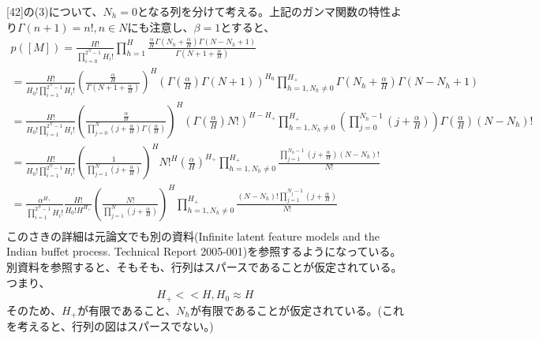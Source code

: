 ﻿\documentclass{jsarticle}
\begin{document}
[42]の(3)について、$N_h = 0$となる列を分けて考える。上記のガンマ関数の特性より$\Gamma(n+1) = n!, n \in N$にも注意し、$\beta = 1$とすると、
\begin{equation}
\begin{split}
p([M]) = \frac{H!}{\prod_{i=0}^{2^N - 1}H_i!} \prod_{h=1}^H \frac{\frac{\alpha}{H}\Gamma(N_h + \frac{\alpha}{H})\Gamma(N - N_h + 1)}{\Gamma(N + 1 + \frac{\alpha}{H})}\\
= \frac{H!}{H_0! \prod_{i=1}^{2^N - 1}H_i!} (\frac{\frac{\alpha}{H}}{\Gamma(N + 1 + \frac{\alpha}{H})})^H (\Gamma(\frac{\alpha}{H})\Gamma(N + 1))^{H_0} \prod_{h=1, N_h \neq 0}^{H_+} \Gamma(N_h + \frac{\alpha}{H})\Gamma(N - N_h + 1)\\
= \frac{H!}{H_0! \prod_{i=1}^{2^N - 1}H_i!} (\frac{\frac{\alpha}{H}}{\prod_{j = 0}^N (j + \frac{\alpha}{H})\Gamma(\frac{\alpha}{H})})^H (\Gamma(\frac{\alpha}{H})N!)^{H - H_+} \prod_{h=1, N_h \neq 0}^{H_+} (\prod_{j=0}^{N_h - 1}(j + \frac{\alpha}{H}))\Gamma(\frac{\alpha}{H})(N - N_h)!\\
= \frac{H!}{H_0! \prod_{i=1}^{2^N - 1}H_i!} (\frac{1}{\prod_{j = 1}^N (j + \frac{\alpha}{H})})^H N!^{H} (\frac{\alpha}{H})^{H_+}\prod_{h=1, N_h \neq 0}^{H_+} \frac{\prod_{j=1}^{N_h - 1}(j + \frac{\alpha}{H})(N - N_h)!}{N!}\\
= \frac{\alpha^{H_+}}{\prod_{i=1}^{2^N - 1}H_i!} \frac{H!}{H_0!H^{H_+}}(\frac{N!}{\prod_{j = 1}^N (j + \frac{\alpha}{H})})^H \prod_{h=1, N_h \neq 0}^{H_+} \frac{(N - N_h)!\prod_{j=1}^{N_j - 1}(j + \frac{\alpha}{H})}{N!}\\
\end{split}
\end{equation}
このさきの詳細は元論文でも別の資料(Infinite latent feature models and the Indian buffet process. Technical Report 2005-001)を参照するようになっている。別資料を参照すると、そもそも、行列はスパースであることが仮定されている。
つまり、
\begin{equation}
H_+ << H, H_0 \approx H
\end{equation}
そのため、$H_+$が有限であること、$N_h$が有限であることが仮定されている。(これを考えると、行列の図はスパースでない。)
\end{document}
